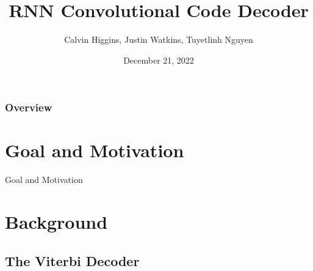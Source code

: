 \documentclass{beamer}
\title[RNN Decoder]{RNN Convolutional Code Decoder} %
\author{Calvin Higgins, Justin Watkins, Tuyetlinh Nguyen} %
\institute[URI] %
{
University of Rhode Island %
}
\date{December 21, 2022} %
\newcommand{\<}				{\langle}
\renewcommand{\>}      		{\rangle}
\begin{document}

\begin{frame}
\titlepage %
\end{frame}


\begin{frame}
\frametitle{Overview} %
\tableofcontents %
\end{frame}


\section{Goal and Motivation} 

\begin{frame}{Goal and Motivation}


\end{frame}

\section{Background} 

\subsection{The Viterbi Decoder} 
\end{document}
